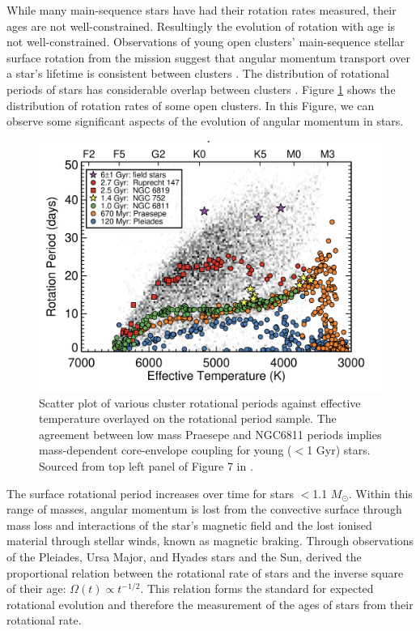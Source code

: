 While many main-sequence stars have had their rotation rates measured, their ages are not well-constrained.
Resultingly the evolution of rotation with age is not well-constrained.
Observations of young open clusters' main-sequence stellar surface rotation from the \kepler{} mission suggest that angular momentum transport over a star's lifetime is consistent between clusters \citep{spada_competing_2020}.
The distribution of rotational periods of stars has considerable overlap between clusters \citep{spina_how_2020, curtis_when_2020}. 
Figure \ref{fig:cluster_rotational_periods} shows the distribution of rotation rates of some open clusters.
In this Figure, we can observe some significant aspects of the evolution of angular momentum in stars.

\begin{figure}[h]
    \includegraphics[width=\textwidth]{Figures/intro_figures/cluster_kepler.png}
    \caption[Cluster rotational periods against effective temperature]{Scatter plot of various cluster rotational periods against effective temperature overlayed on the \kepler{} \citep{mcquillan_rotation_2014} rotational period sample.
    The agreement between low mass Praesepe and NGC6811 periods implies mass-dependent core-envelope coupling for young ($<$1 Gyr) stars.
    Sourced from top left panel of Figure 7 in \citet{curtis_when_2020}.}
    \label{fig:cluster_rotational_periods}
\end{figure}

The surface rotational period increases over time for stars $<$1.1 $M_{\odot}$.
Within this range of masses, angular momentum is lost from the convective surface through mass loss and interactions of the star's magnetic field and the lost ionised material through stellar winds, known as magnetic braking.
Through observations of the Pleiades, Ursa Major, and Hyades stars and the Sun, \citet{skumanich_time_1972} derived the proportional relation between the rotational rate of stars and the inverse square of their age: $\Omega(t) \propto t^{-1/2}$.
This relation forms the standard for expected rotational evolution and therefore the measurement of the ages of stars from their rotational rate.


